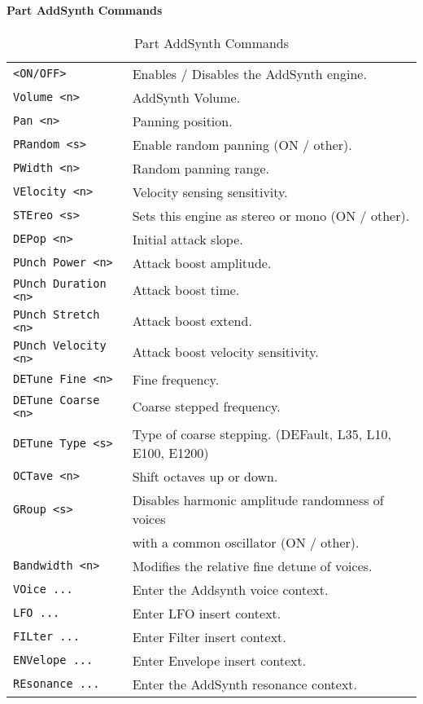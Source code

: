\paragraph{Part AddSynth Commands}
\label{paragraph:command_line_part_addsynth_commands}
   \begin{table}[H]
      \centering
      \caption{Part AddSynth Commands}
      \label{table:yoshimi_part_addsynth_commands}
      \begin{tabular}{l l}
\texttt{<ON/OFF>} &
   Enables / Disables the AddSynth engine. \\
\texttt{Volume <n>} &
   AddSynth Volume.  \\
\texttt{Pan <n>} &
   Panning position.\\
\texttt{PRandom <s>} &
   Enable random panning (ON / other).\\
\texttt{PWidth <n>} &
   Random panning range.\\
\texttt{VElocity <n>} &
   Velocity sensing sensitivity. \\
\texttt{STEreo <s>} &
   Sets this engine as stereo or mono (ON / other). \\
\texttt{DEPop <n>} &
   Initial attack slope.   \\
\texttt{PUnch Power <n>} &
   Attack boost amplitude. \\
\texttt{PUnch Duration <n>} &
   Attack boost time.   \\
\texttt{PUnch Stretch <n>} &
   Attack boost extend. \\
\texttt{PUnch Velocity <n>} &
   Attack boost velocity sensitivity.  \\
\texttt{DETune Fine <n>} &
   Fine frequency.   \\
\texttt{DETune Coarse <n>} &
   Coarse stepped frequency.  \\
\texttt{DETune Type <s>} &
   Type of coarse stepping. (DEFault, L35, L10, E100, E1200)  \\
\texttt{OCTave <n>} &
   Shift octaves up or down.  \\
\texttt{GRoup <s>} &
   Disables harmonic amplitude randomness of voices \\
\texttt{ } &
             with a common oscillator (ON / other). \\
\texttt{Bandwidth <n>} &
   Modifies the relative fine detune of voices. \\
\texttt{VOice ...} &
   Enter the Addsynth voice context. \\
\texttt{LFO ...} &
   Enter LFO insert context.  \\
\texttt{FILter ...} &
   Enter Filter insert context.  \\
\texttt{ENVelope ...} &
   Enter Envelope insert context.   \\
\texttt{REsonance ...} &
   Enter the AddSynth resonance context. \\
      \end{tabular}
   \end{table}

